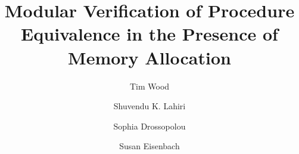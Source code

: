 \documentclass[runningheads,a4paper]{llncs}
\begin{document}
\mainmatter  %

\title{Modular Verification of Procedure Equivalence in the Presence of Memory Allocation} 


%
%
\author{Tim Wood \and Shuvendu K. Lahiri \and Sophia Drossopolou \and Susan Eisenbach}
%


%
%

\maketitle

\newcommand*\symdiffequivn{e-equivalence}
\newcommand*\Symdiffequivn{E-equivalence}
\newcommand*\symdiffequiva{e-equivalent}
\newcommand*\Symdiffequiva{E-equivalent}
\newcommand*\cone{challenge~1}
\newcommand*\ctwo{challenge~2}
\newcommand*\cthree{challenge~3}
\newcommand*\cfour{challenge~4}
\newcommand*\Cone{Challenge~1}
\newcommand*\Ctwo{Challenge~2}
\newcommand*\Cthree{Challenge~3}
\newcommand*\Cfour{Challenge~4}
\newcommand*\metho{RIE}
\newcommand*\tool{APE}
\newcommand*\Tool{APE}
\end{document}
